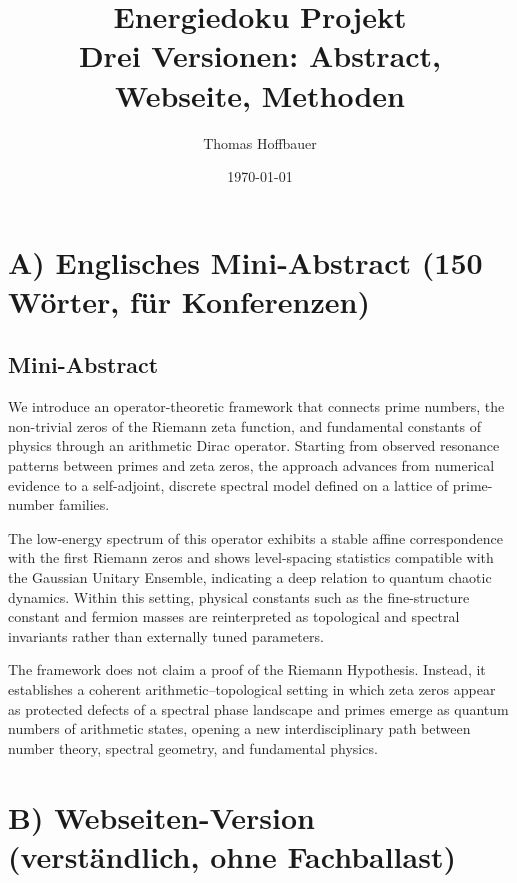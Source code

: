 \documentclass[11pt,a4paper]{article}
\title{Energiedoku Projekt\\
Drei Versionen: Abstract, Webseite, Methoden}
\author{Thomas Hoffbauer}
\date{\today}
\begin{document}
\maketitle

\newpage

\section*{A) Englisches Mini-Abstract (150 Wörter, für Konferenzen)}

\subsection*{Mini-Abstract}

We introduce an operator-theoretic framework that connects prime numbers, the non-trivial zeros of the Riemann zeta function, and fundamental constants of physics through an arithmetic Dirac operator. Starting from observed resonance patterns between primes and zeta zeros, the approach advances from numerical evidence to a self-adjoint, discrete spectral model defined on a lattice of prime-number families.

The low-energy spectrum of this operator exhibits a stable affine correspondence with the first Riemann zeros and shows level-spacing statistics compatible with the Gaussian Unitary Ensemble, indicating a deep relation to quantum chaotic dynamics. Within this setting, physical constants such as the fine-structure constant and fermion masses are reinterpreted as topological and spectral invariants rather than externally tuned parameters.

The framework does not claim a proof of the Riemann Hypothesis. Instead, it establishes a coherent arithmetic--topological setting in which zeta zeros appear as protected defects of a spectral phase landscape and primes emerge as quantum numbers of arithmetic states, opening a new interdisciplinary path between number theory, spectral geometry, and fundamental physics.

\newpage

\section*{B) Webseiten-Version (verständlich, ohne Fachballast)}
\end{document}
